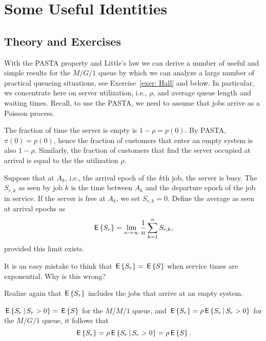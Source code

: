 \section{Some Useful Identities}
\label{sec:some-usef-ident}


\subsection*{Theory and Exercises}

With the PASTA property and Little's law we can derive a number of
useful and simple results for the $M/G/1$ queue by which we can analyze a large number of practical queueing situations, see Exercise~\ref{exer: Hall} and below. In particular, we concentrate here on server utilization, i.e., $\rho$, and average queue length and waiting times. Recall, to use the
PASTA, we need to assume that jobs arrive as a Poisson process.

The fraction of time the server is empty is $1-\rho = p(0)$. By PASTA,
$\pi(0)=p(0)$, hence the fraction of customers that enter an empty
system is also $1-\rho$. Similarly, the fraction of customers that find the server occupied at arrival is equal to the the utilization $\rho$. 



Suppose that at $A_k$, i.e., the arrival epoch of the $k$th job, the
server is busy.  The  $S_{r,k}$ as seen by job
$k$ is the time between $A_k$ and the departure epoch of the job in
service. If the server is free at $A_k$, we set $S_{r,k}=0$.  Define
the average  as seen at arrival epochs as
\begin{equation*}
  \,\mathsf{E}\left\{S_r\right\} = \lim_{n\to\infty} \frac1n \sum_{k=1}^n S_{r,k},
\end{equation*}
provided this limit exists. 

\begin{exercise}
  It is an easy mistake to think that $\,\mathsf{E}\left\{S_r\right\} = \,\mathsf{E}\left\{S\right\}$ when service
  times are exponential. Why is this wrong?
  \begin{hint}
Realize again that $\,\mathsf{E}\left\{S_r\right\}$ includes the jobs that arrive at an empty system.
  \end{hint}
  \begin{solution}
    $\,\mathsf{E}\left\{S_r \,\middle|\, S_r>0\right\} = \,\mathsf{E}\left\{S\right\}$ for the $M/M/1$ queue, and
    $\,\mathsf{E}\left\{S_r\right\} = \rho \,\mathsf{E}\left\{S_r \,\middle|\, S_r>0\right\}$ for the $M/G/1$ queue, it
    follows that
  \begin{equation*}
 \,\mathsf{E}\left\{S_r\right\} = \rho \,\mathsf{E}\left\{S_r\,\middle|\, S_r>0\right\} = \rho \,\mathsf{E}\left\{S\right\}.
  \end{equation*}
  \end{solution}
\end{exercise}

